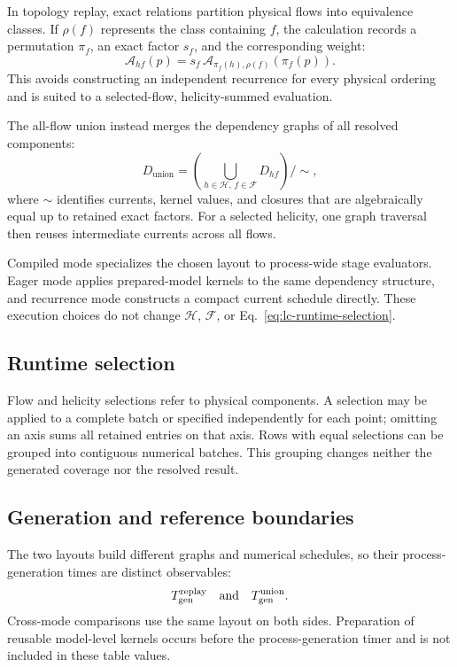 In topology replay, exact relations partition physical flows into equivalence
classes. If \(\rho(f)\) represents the class containing \(f\), the calculation
records a permutation \(\pi_f\), an exact factor \(s_f\), and the corresponding
weight:
\begin{equation}
  \mathcal A_{h f}(p)
  =s_f\,\mathcal A_{\pi_f(h),\rho(f)}\!\left(\pi_f(p)\right).
  \label{eq:lc-topology-replay}
\end{equation}
This avoids constructing an independent recurrence for every physical ordering
and is suited to a selected-flow, helicity-summed evaluation.

The all-flow union instead merges the dependency graphs of all resolved
components:
\begin{equation}
  D_{\mathrm{union}}
  =\left(\bigcup_{h\in\mathcal H,\,f\in\mathcal F}D_{hf}\right)
   \big/\!\sim ,
  \label{eq:lc-all-flow-union}
\end{equation}
where \(\sim\) identifies currents, kernel values, and closures that are
algebraically equal up to retained exact factors.  For a selected helicity,
one graph traversal then reuses intermediate currents across all flows.

Compiled mode specializes the chosen layout to process-wide stage evaluators.
Eager mode applies prepared-model kernels to the same dependency structure,
and recurrence mode constructs a compact current schedule directly. These
execution choices do not change \(\mathcal H\), \(\mathcal F\), or
Eq.~\eqref{eq:lc-runtime-selection}.

\subsection{Runtime selection}

Flow and helicity selections refer to physical components.  A selection may be
applied to a complete batch or specified independently for each point; omitting
an axis sums all retained entries on that axis.  Rows with equal selections can
be grouped into contiguous numerical batches.  This grouping changes neither
the generated coverage nor the resolved result.

\subsection{Generation and reference boundaries}

The two layouts build different graphs and numerical schedules, so their
process-generation times are distinct observables:
\begin{equation}
  T_{\mathrm{gen}}^{\mathrm{replay}}
  \quad\hbox{and}\quad
  T_{\mathrm{gen}}^{\mathrm{union}}.
  \label{eq:lc-two-generation-times}
\end{equation}
Cross-mode comparisons use the same layout on both sides.  Preparation of
reusable model-level kernels occurs before the process-generation timer and is
not included in these table values.

